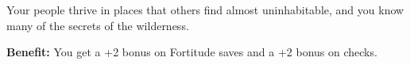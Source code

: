 
Your people thrive in places that others find almost uninhabitable, and you know many of the secrets of the wilderness.

\textbf{Benefit:} You get a +2 bonus on Fortitude saves and a +2 bonus on  checks.
